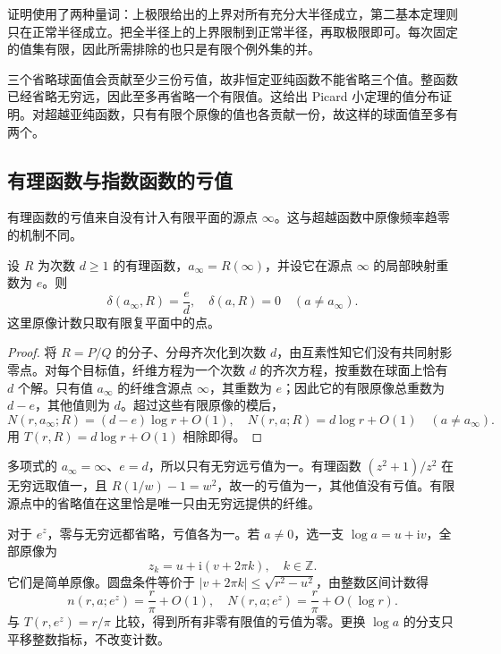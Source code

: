 证明使用了两种量词：上极限给出的上界对所有充分大半径成立，第二基本定理则只在正常半径成立。把全半径上的上界限制到正常半径，再取极限即可。每次固定的值集有限，因此所需排除的也只是有限个例外集的并。

\ProseParagraphBreak

三个省略球面值会贡献至少三份亏值，故非恒定亚纯函数不能省略三个值。整函数已经省略无穷远，因此至多再省略一个有限值。这给出 Picard 小定理的值分布证明。对超越亚纯函数，只有有限个原像的值也各贡献一份，故这样的球面值至多有两个。

\subsection{有理函数与指数函数的亏值}
\label{b3:subsec:C0403}

有理函数的亏值来自没有计入有限平面的源点 \(\infty\)。这与超越函数中原像频率趋零的机制不同。

\begin{proposition}[有理函数的亏值]\label{b3:prop:C-rational-defects}
设 \(R\) 为次数 \(d\ge1\) 的有理函数，\(a_\infty=R(\infty)\)，并设它在源点 \(\infty\) 的局部映射重数为 \(e\)。则
\[
 \delta(a_\infty,R)=\frac ed,
 \quad \delta(a,R)=0\quad(a\ne a_\infty).
\]
这里原像计数只取有限复平面中的点。
\end{proposition}
\begin{proof}
将 \(R=P/Q\) 的分子、分母齐次化到次数 \(d\)，由互素性知它们没有共同射影零点。对每个目标值，纤维方程为一个次数 \(d\) 的齐次方程，按重数在球面上恰有 \(d\) 个解。只有值 \(a_\infty\) 的纤维含源点 \(\infty\)，其重数为 \(e\)；因此它的有限原像总重数为 \(d-e\)，其他值则为 \(d\)。超过这些有限原像的模后，
\[
 N(r,a_\infty;R)=(d-e)\log r+O(1),
 \quad N(r,a;R)=d\log r+O(1)\quad(a\ne a_\infty).
\]
用 \(T(r,R)=d\log r+O(1)\) 相除即得。
\end{proof}

多项式的 \(a_\infty=\infty\)、\(e=d\)，所以只有无穷远亏值为一。有理函数 \((z^2+1)/z^2\) 在无穷远取值一，且 \(R(1/w)-1=w^2\)，故一的亏值为一，其他值没有亏值。有限源点中的省略值在这里恰是唯一只由无穷远提供的纤维。

\ProseParagraphBreak

对于 \(e^z\)，零与无穷远都省略，亏值各为一。若 \(a\ne0\)，选一支 \(\log a=u+\mathrm{i}v\)，全部原像为
\[
 z_k=u+\mathrm{i}(v+2\pi k),\quad k\in\mathbb Z.
\]
它们是简单原像。圆盘条件等价于 \(|v+2\pi k|\le\sqrt{r^2-u^2}\)，由整数区间计数得
\[
 n(r,a;e^z)=\frac r\pi+O(1),
 \quad N(r,a;e^z)=\frac r\pi+O(\log r).
\]
与 \(T(r,e^z)=r/\pi\) 比较，得到所有非零有限值的亏值为零。更换 \(\log a\) 的分支只平移整数指标，不改变计数。

